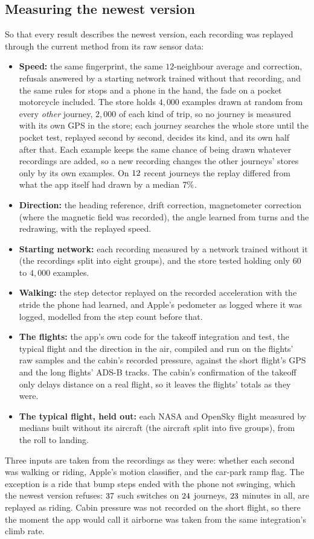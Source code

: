 \documentclass[11pt]{article}
\begin{document}
\subsection{Measuring the newest version}\label{sec:eval}

So that every result describes the newest version, each recording was replayed through the current
method from its raw sensor data:
\begin{itemize}
\item \textbf{Speed:} the same fingerprint, the same $12$-neighbour average and correction, refusals
answered by a starting network trained without that recording, and the same rules for stops and a
phone in the hand, the fade on a pocket motorcycle included. The store holds
$4{,}000$ examples drawn at random from every \emph{other} journey, $2{,}000$ of each kind of trip, so no
journey is measured with its own GPS in the store; each journey searches the whole store until the
pocket test, replayed second by second, decides its kind, and its own half after that. Each example keeps the same chance of being drawn whatever recordings are added,
so a new recording changes the other journeys' stores only by its own examples. On $12$ recent
journeys the replay differed from what the app itself had drawn by a median $7\%$.
\item \textbf{Direction:} the heading reference, drift correction, magnetometer correction (where the
magnetic field was recorded), the angle learned from turns and the redrawing, with the replayed speed.
\item \textbf{Starting network:} each recording measured by a network trained without it (the
recordings split into eight groups), and the store tested holding only $60$ to $4{,}000$ examples.
\item \textbf{Walking:} the step detector replayed on the recorded acceleration with the stride the
phone had learned, and Apple's pedometer as logged where it was logged, modelled from the step count
before that.
\item \textbf{The flights:} the app's own code for the takeoff integration and test, the typical
flight and the direction in the air, compiled and run on the flights' raw samples and the cabin's
recorded pressure, against the short flight's GPS and the long flights' ADS-B tracks. The cabin's
confirmation of the takeoff only delays distance on a real flight, so it leaves the flights' totals as
they were.
\item \textbf{The typical flight, held out:} each NASA and OpenSky flight measured by medians built without
its aircraft (the aircraft split into five groups), from the roll to landing.
\end{itemize}
Three inputs are taken from the recordings as they were: whether each second was walking or riding,
Apple's motion classifier, and the car-park ramp flag. The exception is a ride that bump steps ended with
the phone not swinging, which the newest version refuses: $37$ such switches on $24$ journeys,
$23$ minutes in all, are replayed as riding. Cabin pressure was not recorded on the short
flight, so there the moment the app would call it airborne was taken from the same integration's climb rate.
\end{document}
